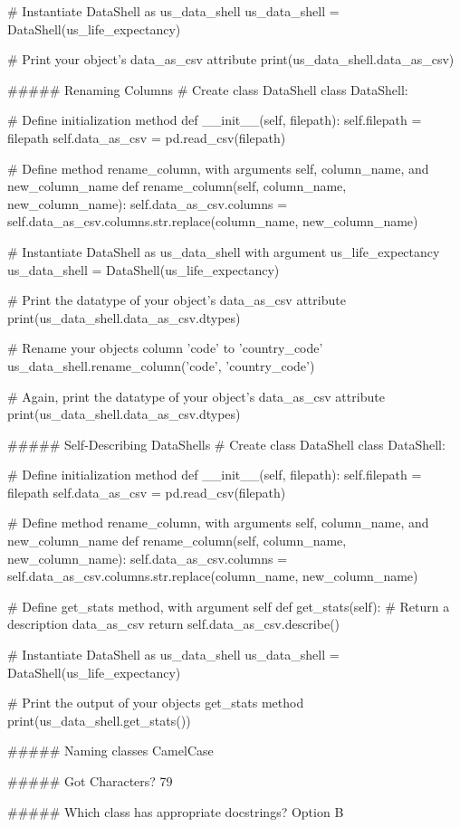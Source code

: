 # Instantiate DataShell as us_data_shell
us_data_shell = DataShell(us_life_expectancy)

# Print your object's data_as_csv attribute
print(us_data_shell.data_as_csv)


##### Renaming Columns
# Create class DataShell
class DataShell:
  
    # Define initialization method
    def __init__(self, filepath):
        self.filepath = filepath
        self.data_as_csv = pd.read_csv(filepath)
    
    # Define method rename_column, with arguments self, column_name, and new_column_name
    def rename_column(self, column_name, new_column_name):
        self.data_as_csv.columns = self.data_as_csv.columns.str.replace(column_name, new_column_name)

# Instantiate DataShell as us_data_shell with argument us_life_expectancy
us_data_shell = DataShell(us_life_expectancy)

# Print the datatype of your object's data_as_csv attribute
print(us_data_shell.data_as_csv.dtypes)

# Rename your objects column 'code' to 'country_code'
us_data_shell.rename_column('code', 'country_code')

# Again, print the datatype of your object's data_as_csv attribute
print(us_data_shell.data_as_csv.dtypes)


##### Self-Describing DataShells
# Create class DataShell
class DataShell:

    # Define initialization method
    def __init__(self, filepath):
        self.filepath = filepath
        self.data_as_csv = pd.read_csv(filepath)

    # Define method rename_column, with arguments self, column_name, and new_column_name
    def rename_column(self, column_name, new_column_name):
        self.data_as_csv.columns = self.data_as_csv.columns.str.replace(column_name, new_column_name)
        
    # Define get_stats method, with argument self
    def get_stats(self):
        # Return a description data_as_csv
        return self.data_as_csv.describe()
    
# Instantiate DataShell as us_data_shell
us_data_shell = DataShell(us_life_expectancy)

# Print the output of your objects get_stats method
print(us_data_shell.get_stats())


##### Naming classes
CamelCase


##### Got Characters?
79


##### Which class has appropriate docstrings?
Option B

